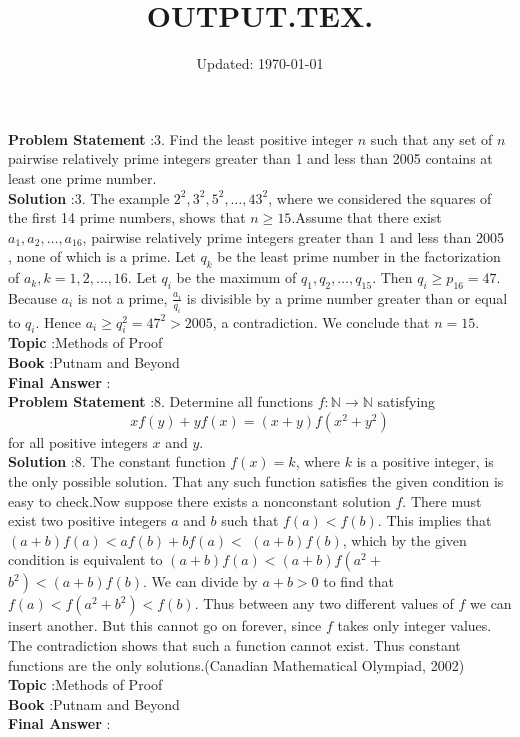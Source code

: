 \documentclass[10pt]{article}
\title{OUTPUT.TEX.}
\date{Updated: \today}
\author{}
\begin{document}
\textbf{Problem Statement} :3. Find the least positive integer $n$ such that any set of $n$ pairwise relatively prime integers greater than 1 and less than 2005 contains at least one prime number. \\
\textbf{Solution} :3. The example $2^{2}, 3^{2}, 5^{2}, \ldots, 43^{2}$, where we considered the squares of the first 14 prime numbers, shows that $n \geq 15$.Assume that there exist $a_{1}, a_{2}, \ldots, a_{16}$, pairwise relatively prime integers greater than 1 and less than 2005 , none of which is a prime. Let $q_{k}$ be the least prime number in the factorization of $a_{k}, k=1,2, \ldots, 16$. Let $q_{i}$ be the maximum of $q_{1}, q_{2}, \ldots, q_{15}$. Then $q_{i} \geq p_{16}=47$. Because $a_{i}$ is not a prime, $\frac{a_{i}}{q_{i}}$ is divisible by a prime number greater than or equal to $q_{i}$. Hence $a_{i} \geq q_{i}^{2}=47^{2}>2005$, a contradiction. We conclude that $n=15$.\\
\textbf{Topic} :Methods of Proof\\
\textbf{Book} :Putnam and Beyond\\
\textbf{Final Answer} :\\


\textbf{Problem Statement} :8. Determine all functions $f: \mathbb{N} \rightarrow \mathbb{N}$ satisfying$$ x f(y)+y f(x)=(x+y) f\left(x^{2}+y^{2}\right) $$for all positive integers $x$ and $y$.\\
\textbf{Solution} :8. The constant function $f(x)=k$, where $k$ is a positive integer, is the only possible solution. That any such function satisfies the given condition is easy to check.Now suppose there exists a nonconstant solution $f$. There must exist two positive integers $a$ and $b$ such that $f(a)<f(b)$. This implies that $(a+b) f(a)<a f(b)+b f(a)<$ $(a+b) f(b)$, which by the given condition is equivalent to $(a+b) f(a)<(a+b) f\left(a^{2}+\right.$ $\left.b^{2}\right)<(a+b) f(b)$. We can divide by $a+b>0$ to find that $f(a)<f\left(a^{2}+b^{2}\right)<f(b)$. Thus between any two different values of $f$ we can insert another. But this cannot go on forever, since $f$ takes only integer values. The contradiction shows that such a function cannot exist. Thus constant functions are the only solutions.(Canadian Mathematical Olympiad, 2002)\\
\textbf{Topic} :Methods of Proof\\
\textbf{Book} :Putnam and Beyond\\
\textbf{Final Answer} :\\
\end{document}
